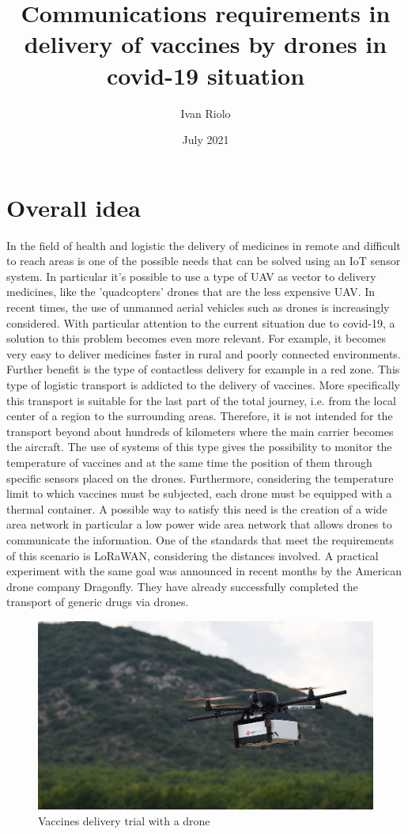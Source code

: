 \documentclass[12pt]{report}
\title{Communications requirements in delivery of vaccines by drones in covid-19 situation}
\author{Ivan Riolo }
\date{July 2021}
\begin{document}
\maketitle
\tableofcontents

\chapter{Overall idea}

In the field of health and logistic the delivery of medicines in remote and difficult to reach areas is one of the possible needs that can be solved using an IoT sensor system. In particular it's possible to use a type of UAV as vector to delivery medicines, like the 'quadcopters' drones that are the less expensive UAV. In recent times, the use of unmanned aerial vehicles such as drones is increasingly considered.
With particular attention to the current situation due to covid-19, a solution to this problem becomes even more relevant.
For example, it becomes very easy to deliver medicines faster in rural and poorly connected environments. Further benefit is the type of contactless delivery for example in a red zone. This type of logistic transport is addicted to the delivery of vaccines. More specifically this transport is suitable for the last part of the total journey, i.e. from the local center of a region to the surrounding areas. Therefore, it is not intended for the transport beyond about hundreds of kilometers where the main carrier becomes the aircraft. The use of systems of this type gives the possibility to monitor the temperature of vaccines and at the same time the position of them 
through specific sensors placed on the drones. Furthermore, considering the temperature limit to which vaccines must be subjected, each drone must be equipped with a thermal container. 
A possible way to satisfy this need is the creation of a wide area network in particular a low power wide area network that allows drones to communicate the information. One of the standards that meet the requirements of this scenario is LoRaWAN, considering the distances involved. 
A practical experiment with the same goal was announced in recent months by the American drone company Dragonfly. They have already successfully completed the transport of generic drugs via drones.

\begin{figure}[h!]
    \centering
    \includegraphics[width=14cm]{Pictures/Drone delivery.jpg}
    \caption{Vaccines delivery trial with a drone}
\end{figure}
\end{document}
